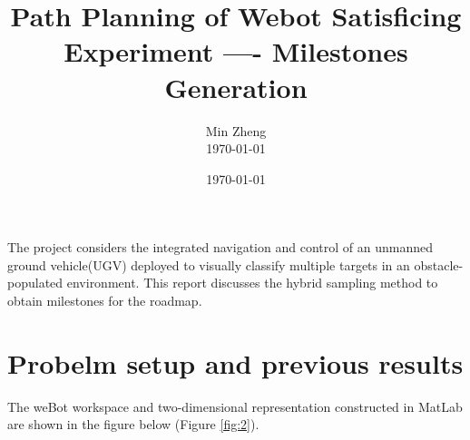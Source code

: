 \documentclass[12pt,draftcls,onecolumn]{IEEEtran}
\begin{document}
\title{Path Planning of Webot Satisficing Experiment ----  Milestones Generation}


\author{  Min Zheng \\  \today}

\date{\today}

\maketitle



The project considers the integrated navigation and control of an unmanned ground vehicle(UGV) deployed to visually classify multiple targets in an obstacle-populated environment. 
This report discusses the hybrid sampling method to obtain milestones for the roadmap. 

\section{Probelm setup and previous results} 

The weBot workspace and two-dimensional representation constructed in MatLab are shown in the figure below  (Figure \ref{fig:2}). 
\end{document}
